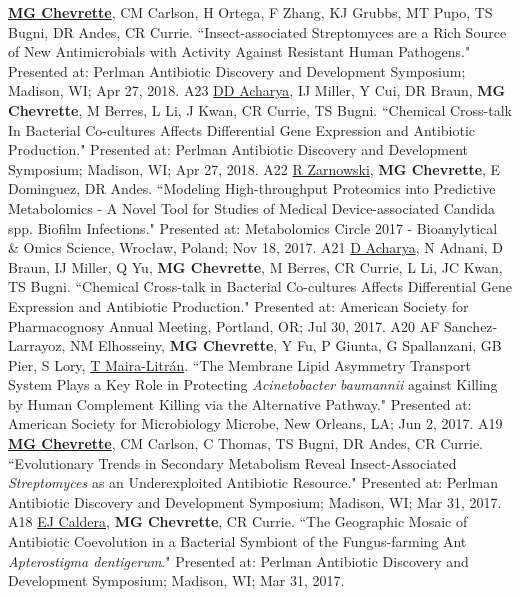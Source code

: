 \begin{cvpubs}
  \cvpub
    {\underline{\textbf{MG Chevrette}}, CM Carlson, H Ortega, F Zhang, KJ Grubbs, MT Pupo, TS Bugni, DR Andes, CR Currie. ``Insect-associated Streptomyces are a Rich Source of New Antimicrobials with Activity Against Resistant Human Pathogens." Presented at: Perlman Antibiotic Discovery and Development Symposium; Madison, WI; Apr 27, 2018.} %
    {A23} %
  \cvpub
    {\underline{DD Acharya}, IJ Miller, Y Cui, DR Braun, \textbf{MG Chevrette}, M Berres, L Li, J Kwan, CR Currie, TS Bugni. ``Chemical Cross-talk In Bacterial Co-cultures Affects Differential Gene Expression and Antibiotic Production." Presented at: Perlman Antibiotic Discovery and Development Symposium; Madison, WI; Apr 27, 2018.} %
    {A22} %
  \cvpub
    {\underline{R Zarnowski}, \textbf{MG Chevrette}, E Dominguez, DR Andes. ``Modeling High-throughput Proteomics into Predictive Metabolomics - A Novel Tool for Studies of Medical Device-associated Candida spp. Biofilm Infections." Presented at: Metabolomics Circle 2017 - Bioanylytical \& Omics Science, Wrocław, Poland; Nov 18, 2017.} %
    {A21} %
  \cvpub
    {\underline{D Acharya}, N Adnani, D Braun, IJ Miller, Q Yu, \textbf{MG Chevrette}, M Berres, CR Currie, L Li, JC Kwan, TS Bugni. ``Chemical Cross-talk in Bacterial Co-cultures Affects Differential Gene Expression and Antibiotic Production." Presented at: American Society for Pharmacognosy Annual Meeting, Portland, OR; Jul 30, 2017.} %
    {A20} %
  \cvpub
    {AF Sanchez-Larrayoz, NM Elhosseiny, \textbf{MG Chevrette}, Y Fu, P Giunta, G Spallanzani, GB Pier, S Lory, \underline{T Maira-Litr\'{a}n}. ``The Membrane Lipid Asymmetry Transport System Plays a Key Role in Protecting \textit{Acinetobacter baumannii} against Killing by Human Complement Killing via the Alternative Pathway." Presented at: American Society for Microbiology Microbe, New Orleans, LA; Jun 2, 2017.} %
    {A19} %
  \cvpub
    {\underline{\textbf{MG Chevrette}}, CM Carlson, C Thomas, TS Bugni, DR Andes, CR Currie. ``Evolutionary Trends in Secondary Metabolism Reveal Insect-Associated \textit{Streptomyces} as an Underexploited Antibiotic Resource." Presented at: Perlman Antibiotic Discovery and Development Symposium; Madison, WI; Mar 31, 2017.} %
    {A18} %
  \cvpub
    {\underline{EJ Caldera}, \textbf{MG Chevrette}, CR Currie. ``The Geographic Mosaic of Antibiotic Coevolution in a Bacterial Symbiont of the Fungus-farming Ant \textit{Apterostigma dentigerum}." Presented at: Perlman Antibiotic Discovery and Development Symposium; Madison, WI; Mar 31, 2017.} %

\end{cvpubs}
